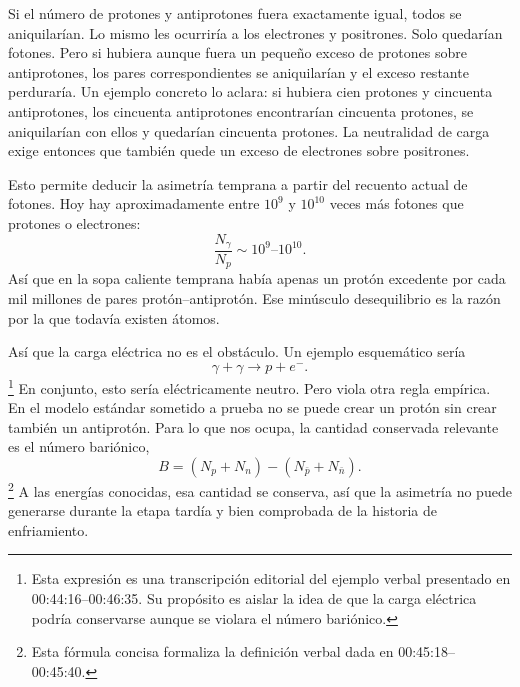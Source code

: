 Si el número de protones y antiprotones fuera exactamente igual, todos se aniquilarían. Lo mismo les ocurriría a los electrones y positrones. Solo quedarían fotones. Pero si hubiera aunque fuera un pequeño exceso de protones sobre antiprotones, los pares correspondientes se aniquilarían y el exceso restante perduraría. Un ejemplo concreto lo aclara: si hubiera cien protones y cincuenta antiprotones, los cincuenta antiprotones encontrarían cincuenta protones, se aniquilarían con ellos y quedarían cincuenta protones. La neutralidad de carga exige entonces que también quede un exceso de electrones sobre positrones.

Esto permite deducir la asimetría temprana a partir del recuento actual de fotones. Hoy hay aproximadamente entre \(10^9\) y \(10^{10}\) veces más fotones que protones o electrones:
\[
\frac{N_\gamma}{N_p} \sim 10^9\text{--}10^{10}.
\]
Así que en la sopa caliente temprana había apenas un protón excedente por cada mil millones de pares protón--antiprotón. Ese minúsculo desequilibrio es la razón por la que todavía existen átomos.

\begin{classroomqa}
\end{classroomqa}

Así que la carga eléctrica no es el obstáculo. Un ejemplo esquemático sería
\[
\gamma + \gamma \to p + e^-.
\]\footnote{Esta expresión es una transcripción editorial del ejemplo verbal presentado en 00:44:16--00:46:35. Su propósito es aislar la idea de que la carga eléctrica podría conservarse aunque se violara el número bariónico.}
En conjunto, esto sería eléctricamente neutro. Pero viola otra regla empírica. En el modelo estándar sometido a prueba no se puede crear un protón sin crear también un antiprotón. Para lo que nos ocupa, la cantidad conservada relevante es el número bariónico,
\[
B=(N_p+N_n)-(N_{\bar p}+N_{\bar n}).
\]\footnote{Esta fórmula concisa formaliza la definición verbal dada en 00:45:18--00:45:40.}
A las energías conocidas, esa cantidad se conserva, así que la asimetría no puede generarse durante la etapa tardía y bien comprobada de la historia de enfriamiento.

